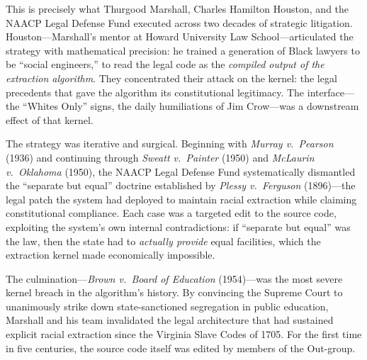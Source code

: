 This is precisely what Thurgood Marshall, Charles Hamilton Houston, and the NAACP Legal Defense Fund executed across two decades of strategic litigation. Houston---Marshall's mentor at Howard University Law School---articulated the strategy with mathematical precision: he trained a generation of Black lawyers to be ``social engineers,'' to read the legal code as the \textit{compiled output of the extraction algorithm}. They concentrated their attack on the kernel: the legal precedents that gave the algorithm its constitutional legitimacy. The interface---the ``Whites Only'' signs, the daily humiliations of Jim Crow---was a downstream effect of that kernel.

The strategy was iterative and surgical. Beginning with \textit{Murray v.\ Pearson} (1936) and continuing through \textit{Sweatt v.\ Painter} (1950) and \textit{McLaurin v.\ Oklahoma} (1950), the NAACP Legal Defense Fund systematically dismantled the ``separate but equal'' doctrine established by \textit{Plessy v.\ Ferguson} (1896)---the legal patch the system had deployed to maintain racial extraction while claiming constitutional compliance. Each case was a targeted edit to the source code, exploiting the system's own internal contradictions: if ``separate but equal'' was the law, then the state had to \textit{actually provide} equal facilities, which the extraction kernel made economically impossible.

The culmination---\textit{Brown v.\ Board of Education} (1954)---was the most severe kernel breach in the algorithm's history. By convincing the Supreme Court to unanimously strike down state-sanctioned segregation in public education, Marshall and his team invalidated the legal architecture that had sustained explicit racial extraction since the Virginia Slave Codes of 1705. For the first time in five centuries, the source code itself was edited by members of the Out-group.

